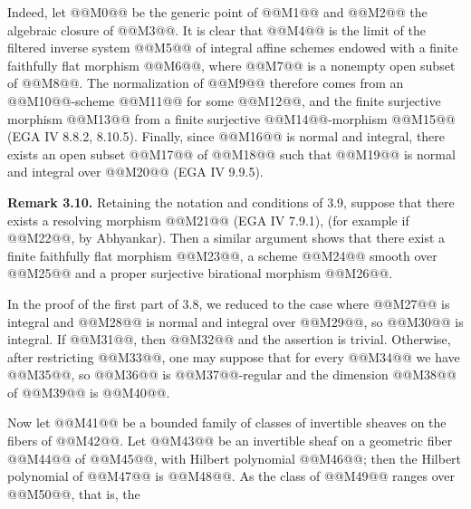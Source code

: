 Indeed, let @@M0@@ be the generic point of @@M1@@ and @@M2@@ the algebraic closure of @@M3@@. It is clear that @@M4@@ is the limit of the filtered inverse system @@M5@@ of integral affine schemes endowed with a finite faithfully flat morphism @@M6@@, where @@M7@@ is a nonempty open subset of @@M8@@. The normalization of @@M9@@ therefore comes from an @@M10@@-scheme @@M11@@ for some @@M12@@, and the finite surjective morphism @@M13@@ from a finite surjective @@M14@@-morphism @@M15@@ (EGA IV 8.8.2, 8.10.5). Finally, since @@M16@@ is normal and integral, there exists an open subset @@M17@@ of @@M18@@ such that @@M19@@ is normal and integral over @@M20@@ (EGA IV 9.9.5).

\textbf{Remark 3.10.} Retaining the notation and conditions of 3.9, suppose that there exists a resolving morphism @@M21@@ (EGA IV 7.9.1), (for example if @@M22@@, by Abhyankar). Then a similar argument shows that there exist a finite faithfully flat morphism @@M23@@, a scheme @@M24@@ smooth over @@M25@@ and a proper surjective birational morphism @@M26@@.

In the proof of the first part of 3.8, we reduced to the case where @@M27@@ is integral and @@M28@@ is normal and integral over @@M29@@, so @@M30@@ is integral. If @@M31@@, then @@M32@@ and the assertion is trivial. Otherwise, after restricting @@M33@@, one may suppose that for every @@M34@@ we have @@M35@@, so @@M36@@ is @@M37@@-regular and the dimension @@M38@@ of @@M39@@ is @@M40@@.

Now let @@M41@@ be a bounded family of classes of invertible sheaves on the fibers of @@M42@@. Let @@M43@@ be an invertible sheaf on a geometric fiber @@M44@@ of @@M45@@, with Hilbert polynomial @@M46@@; then the Hilbert polynomial of @@M47@@ is @@M48@@. As the class of @@M49@@ ranges over @@M50@@, that is, the
